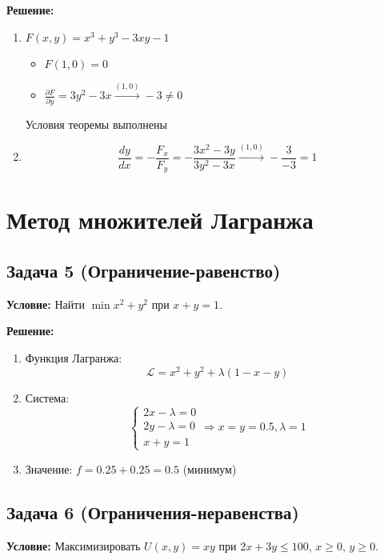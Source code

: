 \documentclass{article}
\begin{document}
\textbf{Решение:}
\begin{enumerate}
\item \(F(x,y) = x^3 + y^3 - 3xy - 1\)
\begin{itemize}
\item \(F(1,0) = 0\)
\item \(\frac{\partial F}{\partial y} = 3y^2 - 3x \xrightarrow{(1,0)} -3 \neq 0\)
\end{itemize}
Условия теоремы выполнены

\item 
\[
\frac{dy}{dx} = -\frac{F_x}{F_y} = -\frac{3x^2 - 3y}{3y^2 - 3x} \xrightarrow{(1,0)} -\frac{3}{-3} = 1
\]
\end{enumerate}

\section*{Метод множителей Лагранжа}

\subsection*{Задача 5 (Ограничение-равенство)}
\textbf{Условие:} Найти \(\min x^2 + y^2\) при \(x + y = 1\).

\textbf{Решение:}
\begin{enumerate}
\item Функция Лагранжа:
\[
\mathcal{L} = x^2 + y^2 + \lambda(1 - x - y)
\]

\item Система:
\[
\begin{cases}
2x - \lambda = 0 \\
2y - \lambda = 0 \\
x + y = 1
\end{cases} 
\Rightarrow x = y = 0.5, \lambda = 1
\]

\item Значение: \(f = 0.25 + 0.25 = 0.5\) (минимум)
\end{enumerate}

\subsection*{Задача 6 (Ограничения-неравенства)}
\textbf{Условие:} Максимизировать \(U(x,y) = xy\) при \(2x + 3y \leq 100\), \(x \geq 0\), \(y \geq 0\).
\end{document}
